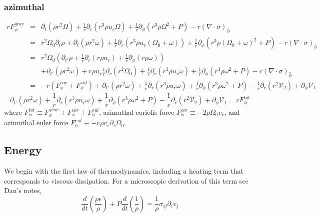 \documentclass{article}
\begin{document}
\subsubsection{azimuthal}
\begin{eqnarray*}
  r F^{grav}_{\phi} &=& \partial_t (\rho r^2 \Omega) + \frac{1}{r}\partial_r (r^3 \rho u_r \Omega ) + \frac{1}{r}\partial_{\phi}(r^3\rho \Omega^2+P) - r(\nabla \cdot \sigma)_{\hat{\phi}} \\
                    &=& r^2\Omega_0\partial_t \rho  + \partial_t (\rho r^2 \omega)  + \frac{1}{r}\partial_r (r^3 \rho u_r (\Omega_0 + \omega) ) + \frac{1}{r}\partial_{\phi}(r^3\rho (\Omega_0 + \omega)^2+P) - r(\nabla \cdot \sigma)_{\hat{\phi}} \\
                    &=& r^2\Omega_0(\partial_{t'} \rho + \frac{1}{r}\partial_r (r \rho u_r )+\frac{1}{r}\partial_{\phi}(r \rho \omega)) \\
                    &&+ \partial_{t'} (\rho r^2 \omega)  + r \rho u_r \frac{1}{r}\partial_r (r^2 \Omega_0 ) + \frac{1}{r}\partial_r (r^3 \rho u_r  \omega )  + \frac{1}{r}\partial_{\phi}(r^3\rho \omega^2+P) - r(\nabla \cdot \sigma)_{\hat{\phi}} \\
                    &=& - r(F^{cor}_{\phi}+F^{eul}_{\phi}) + \partial_{t'} (\rho r^2 \omega)  + \frac{1}{r}\partial_r (r^3 \rho u_r  \omega )  + \frac{1}{r}\partial_{\phi}(r^3\rho \omega^2+P) - \frac{1}{r}\partial_{r}(r^2 \mathcal{V}_2) +\partial_{\phi} \mathcal{V}_1 
\end{eqnarray*}
\begin{equation}
  \boxed{\partial_{t'} (\rho r^2 \omega)  + \frac{1}{r}\partial_r (r^3 \rho u_r  \omega )  + \frac{1}{r}\partial_{\phi}(r^3\rho \omega^2+P) - \frac{1}{r}\partial_{r}(r^2 \mathcal{V}_2) +\partial_{\phi} \mathcal{V}_1 = rF^{tot}_{\phi}}
\end{equation}
where  $F^{tot}_{\phi} \equiv F^{grav}_{\phi} + F^{cor}_{\phi} + F^{eul}_{\phi}$, azimuthal coriolis force $F^{cor}_{\phi} \equiv -2 \rho \Omega_0 v_r$, and azimuthal euler force $F^{eul}_{\phi} \equiv - r\rho v_r\partial_r\Omega_0  $.

\subsection{Energy}
We begin with the first law of thermodynamics, including a heating term that corresponds to viscous dissipation. For a microscopic derivation of this term see Dan's notes,
\begin{equation*}
  \frac{d}{dt} \left( \frac{\rho \epsilon}{\rho} \right) + P \frac{d}{dt} \left( \frac{1}{\rho} \right) = \frac{1}{\rho} \sigma_{ij} \partial_i v_j
\end{equation*}
\end{document}
